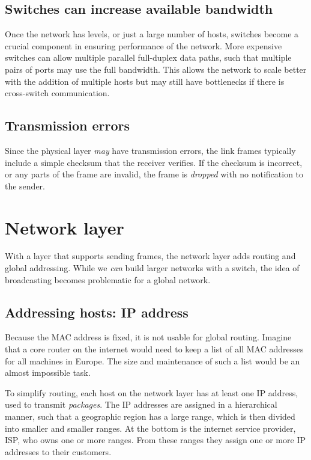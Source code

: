 \subsection{Switches can increase available bandwidth}
Once the network has levels, or just a large number of hosts, switches become a crucial component in ensuring performance of the network. More expensive switches can allow multiple parallel full-duplex data paths, such that multiple pairs of ports may use the full bandwidth. This allows the network to scale better with the addition of multiple hosts but may still have bottlenecks if there is cross-switch communication.

\subsection{Transmission errors}
Since the physical layer \emph{may} have transmission errors, the link frames typically include a simple checksum that the receiver verifies. If the checksum is incorrect, or any parts of the frame are invalid, the frame is \emph{dropped} with no notification to the sender.

\section{Network layer}
With a layer that supports sending frames, the network layer adds routing and global addressing. While we \emph{can} build larger networks with a switch, the idea of broadcasting becomes problematic for a global network. 

\subsection{Addressing hosts: IP address}
Because the MAC address is fixed, it is not usable for global routing. Imagine that a core router on the internet would need to keep a list of all MAC addresses for all machines in Europe. The size and maintenance of such a list would be an almost impossible task.

To simplify routing, each host on the network layer has at least one IP address, used to transmit \emph{packages}. The IP addresses are assigned in a hierarchical manner, such that a geographic region has a large range, which is then divided into smaller and smaller ranges. At the bottom is the internet service provider, ISP, who owns one or more ranges. From these ranges they assign one or more IP addresses to their customers.

